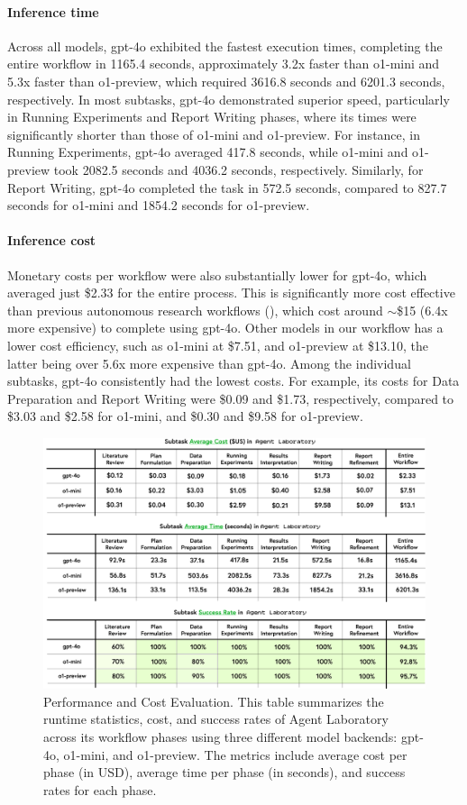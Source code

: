 \documentclass[11pt, a4paper]{gdm_format}
\begin{document}
\paragraph{Inference time} Across all models, gpt-4o exhibited the fastest execution times, completing the entire workflow in 1165.4 seconds, approximately 3.2x faster than o1-mini and 5.3x faster than o1-preview, which required 3616.8 seconds and 6201.3 seconds, respectively. In most subtasks, gpt-4o demonstrated superior speed, particularly in Running Experiments and Report Writing phases, where its times were significantly shorter than those of o1-mini and o1-preview. For instance, in Running Experiments, gpt-4o averaged 417.8 seconds, while o1-mini and o1-preview took 2082.5 seconds and 4036.2 seconds, respectively. Similarly, for Report Writing, gpt-4o completed the task in 572.5 seconds, compared to 827.7 seconds for o1-mini and 1854.2 seconds for o1-preview.

\paragraph{Inference cost} Monetary costs per workflow were also substantially lower for gpt-4o, which averaged just \$2.33 for the entire process. This is significantly more cost effective than previous autonomous research workflows (\cite{lu2024aiscientist}), which cost around $\sim$\$15 (6.4x more expensive) to complete using gpt-4o. Other models in our workflow has a lower cost efficiency, such as o1-mini at \$7.51, and o1-preview at \$13.10, the latter being over 5.6x more expensive than gpt-4o. Among the individual subtasks, gpt-4o consistently had the lowest costs. For example, its costs for Data Preparation and Report Writing were \$0.09 and \$1.73, respectively, compared to \$3.03 and \$2.58 for o1-mini, and \$0.30 and \$9.58 for o1-preview.


\begin{figure}
    \centering
    \includegraphics[width=0.99\linewidth]{images/pngs/stats.png}
    \caption{Performance and Cost Evaluation. This table summarizes the runtime statistics, cost, and success rates of Agent Laboratory across its workflow phases using three different model backends: gpt-4o, o1-mini, and o1-preview. The metrics include average cost per phase (in USD), average time per phase (in seconds), and success rates for each phase.}
    \label{fig:stats}
\end{figure}
\end{document}
